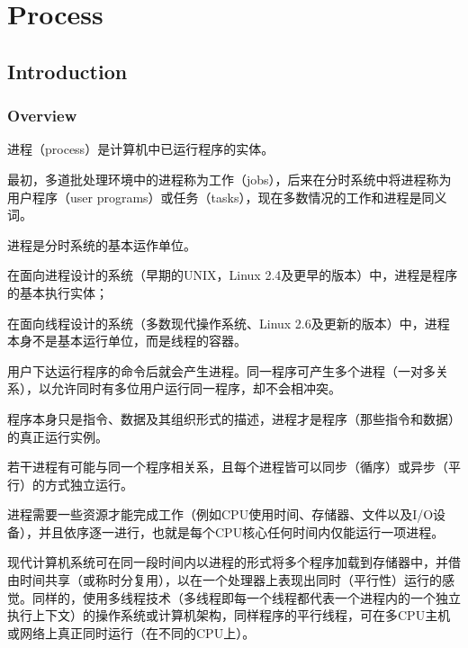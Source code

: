 \part{Process}


\chapter{Introduction}


\section{Overview}


进程（process）是计算机中已运行程序的实体。

最初，多道批处理环境中的进程称为工作（jobs），后来在分时系统中将进程称为用户程序（user programs）或任务（tasks），现在多数情况的工作和进程是同义词。

\begin{compactitem}
\item 进程是分时系统的基本运作单位。
\item 在面向进程设计的系统（早期的UNIX，Linux 2.4及更早的版本）中，进程是程序的基本执行实体；\item 在面向线程设计的系统（多数现代操作系统、Linux 2.6及更新的版本）中，进程本身不是基本运行单位，而是线程的容器。
\end{compactitem}


用户下达运行程序的命令后就会产生进程。同一程序可产生多个进程（一对多关系），以允许同时有多位用户运行同一程序，却不会相冲突。

\begin{compactitem}
\item 程序本身只是指令、数据及其组织形式的描述，进程才是程序（那些指令和数据）的真正运行实例。
\item 若干进程有可能与同一个程序相关系，且每个进程皆可以同步（循序）或异步（平行）的方式独立运行。
\end{compactitem}

进程需要一些资源才能完成工作（例如CPU使用时间、存储器、文件以及I/O设备），并且依序逐一进行，也就是每个CPU核心任何时间内仅能运行一项进程。


现代计算机系统可在同一段时间内以进程的形式将多个程序加载到存储器中，并借由时间共享（或称时分复用），以在一个处理器上表现出同时（平行性）运行的感觉。同样的，使用多线程技术（多线程即每一个线程都代表一个进程内的一个独立执行上下文）的操作系统或计算机架构，同样程序的平行线程，可在多CPU主机或网络上真正同时运行（在不同的CPU上）。




